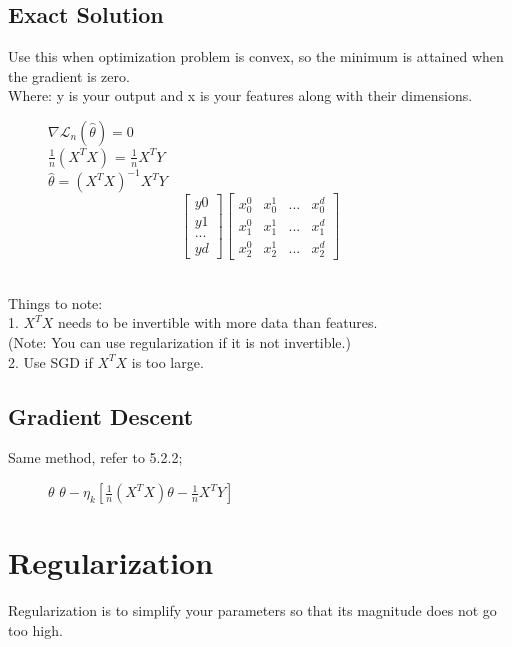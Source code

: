 \documentclass[a4paper]{article}
\begin{document}
\subsection{Exact Solution}
Use this when optimization problem is convex, so the minimum is attained when the gradient is zero.\\
Where: y is your output and x is your features along with their dimensions.
\begin{figure}[h]
    \centering$\nabla \mathcal{L}_n (\hat{\theta}) = 0$\\ 
    $\frac{1}{n} (X^T X)$ = $\frac{1}{n} X^T Y$\\
    $\hat{\theta} = (X^T X)^{-1} X^T Y$\\
\[
\begin{bmatrix}
    y0 \\ y1 \\ ... \\ yd
\end{bmatrix}
\begin{bmatrix}
    x^{0}_{0} & x^{1}_{0} & ... & x^{d}_{0} \\
    x^{0}_{1} & x^{1}_{1} & ... & x^{d}_{1} \\
    x^{0}_{2} & x^{1}_{2} & ... & x^{d}_{2}
    
\end{bmatrix} 
\]
    \end{figure}\\
Things to note: \\
1. $X^T X$ needs to be invertible with more data than features. \\
(Note: You can use regularization if it is not invertible.)\\
2. Use SGD if $X^T X$ is too large. \pagebreak

\subsection{Gradient Descent}
Same method, refer to 5.2.2; 
\begin{figure}[h]
    \centering$\theta$ \leftarrow  $\theta - \eta_k [\frac{1}{n} (X^T X)\theta - \frac{1}{n}X^T Y]$\end{figure}

\section{Regularization}
Regularization is to simplify your parameters so that its magnitude does not go too high.
\end{document}

